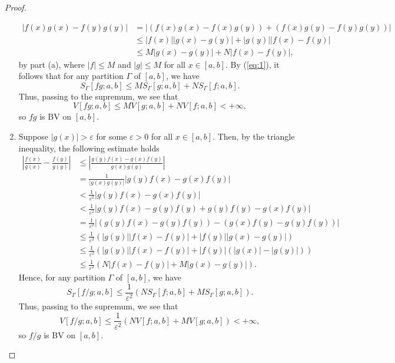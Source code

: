 \begin{proof}
\begin{enumerate}[label=(\roman*)]
  \begin{align}
    \label{eq:1}
    |f(x)g(x)-f(y)g(y)|&=|(f(x)g(x)-f(x)g(y))+(f(x)g(y)-f(y)g(y))|\nonumber\\
                       &\leq|f(x)||g(x)-g(y)|+|g(y)||f(x)-f(y)|\nonumber\\
                       &\leq M|g(x)-g(y)|+N|f(x)-f(y)|,
  \end{align}
  by part (a), where $|f|\leq M$ and $|g|\leq M$ for all $x\in[a,b]$. By
  (\ref{eq:1}), it follows that for any partition $\Gamma$ of $[a,b]$, we have
  \[
    S_\Gamma[fg;a,b]\leq
    MS_\Gamma[g;a,b]+NS_\Gamma[f;a,b].
  \]
  Thus, passing to the supremum, we see that
  \[
    V[fg;a,b]\leq MV[g;a,b]+NV[f;a,b]<+\infty,
  \]
  so $fg$ is BV on $[a,b]$.
\item Suppose $|g(x)|>\varepsilon$ for some $\varepsilon>0$ for all
  $x\in[a,b]$. Then, by the triangle inequality, the following estimate
  holds
  \begin{align}
    \label{eq:2}
    \left|\frac{f(x)}{g(x)}-\frac{f(y)}{g(y)}\right|
    &\leq\left|\frac{g(y)f(x)-g(x)f(y)}{g(x)g(y)}\right|\nonumber\\
    &=\frac{1}{|g(x)g(y)|}\left|g(y)f(x)-g(x)f(y)\right|\nonumber\\
    &<\frac{1}{\varepsilon^2}\left|g(y)f(x)-g(x)f(y)\right|\nonumber\\
    &<\frac{1}{\varepsilon^2}\left|g(y)f(x)-g(y)f(y)
                                  +g(y)f(y)-g(x)f(y)\right|\nonumber\\
    &=\frac{1}{\varepsilon^2}\left|(g(y)f(x)-g(y)f(y))
                                  -(g(x)f(y)-g(y)f(y))\right|\nonumber\\
    &\leq\frac{1}{\varepsilon^2}\left(|g(y)|\left|f(x)-f(y)\right|
                                +|f(y)|\left|g(x)-g(y)\right|\right)\nonumber\\
    &\leq\frac{1}{\varepsilon^2}\left(|g(y)|\left|f(x)-f(y)\right|
      +|f(y)|(\left|g(x)\right|-\left|g(y)\right|)\right)\nonumber\\
    &\leq\frac{1}{\varepsilon^2}\left(N|f(x)-f(y)|+M|g(x)-g(y)|\right).
  \end{align}
  Hence, for any partition $\Gamma$ of $[a,b]$, we have
  \[
    S_\Gamma[f/g;a,b]\leq \frac{1}{\varepsilon^2}
                          \left(NS_\Gamma[f;a,b]+MS_\Gamma[g;a,b]\right).
  \]
  Thus, passing to the supremum, we see that
  \[
  V[f/g;a,b]\leq\frac{1}{\varepsilon^2}(NV[f;a,b]+MV[g;a,b])<+\infty,
  \]
  so $f/g$ is BV on $[a,b]$.
\end{enumerate}
\end{proof}
\newpage


